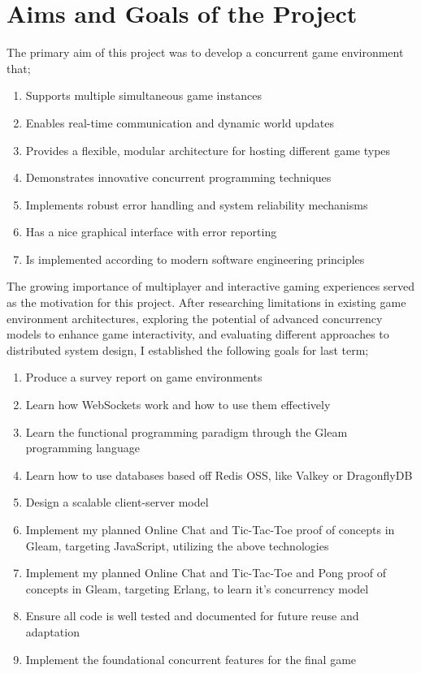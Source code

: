 \documentclass[]{final}
\begin{document}
\section{Aims and Goals of the Project}
The primary aim of this project was to develop a concurrent game environment that;
\begin{enumerate}
  \item Supports multiple simultaneous game instances
  \item Enables real-time communication and dynamic world updates
  \item Provides a flexible, modular architecture for hosting different game types
  \item Demonstrates innovative concurrent programming techniques
  \item Implements robust error handling and system reliability mechanisms
  \item Has a nice graphical interface with error reporting
  \item Is implemented according to modern software engineering principles
\end{enumerate}

\newpage

\label{rationale_importance}

The growing importance of multiplayer and interactive gaming experiences served
as the motivation for this project. After researching limitations in existing
game environment architectures, exploring the potential of advanced
concurrency models to enhance game interactivity, and evaluating different
approaches to distributed system design, I established the following goals
for last term;

\begin{enumerate}
  \item Produce a survey report on game environments
  \item Learn how WebSockets work and how to use them effectively
  \item Learn the functional programming paradigm through the Gleam programming language
  \item Learn how to use databases based off Redis OSS, like Valkey or DragonflyDB
  \item Design a scalable client-server model
  \item Implement my planned Online Chat and Tic-Tac-Toe proof of concepts in Gleam, targeting JavaScript, utilizing the above technologies
  \item Implement my planned Online Chat and Tic-Tac-Toe and Pong proof of concepts in Gleam, targeting Erlang, to learn it's concurrency model
  \item Ensure all code is well tested and documented for future reuse and adaptation
  \item Implement the foundational concurrent features for the final game
\end{enumerate}
\end{document}
